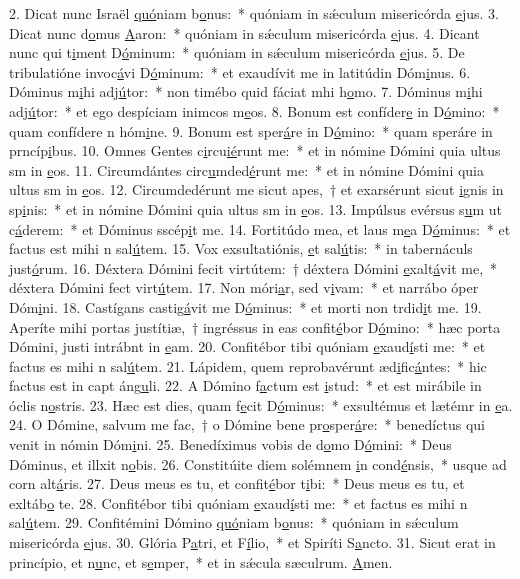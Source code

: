 2. Dicat nunc Israël \uline{quó}niam b\uline{o}nus:~* quóniam in sǽculum misericórda \uline{e}jus.
3. Dicat nunc d\uline{o}mus \uline{A}aron:~* quóniam in sǽculum misericórda \uline{e}jus.
4. Dicant nunc qui t\uline{i}ment D\uline{ó}minum:~* quóniam in sǽculum misericórda \uline{e}jus.
5. De tribulatióne invoc\uline{á}vi D\uline{ó}minum:~* et exaudívit me in latitúdin Dóm\uline{i}nus.
6. Dóminus m\uline{i}hi adj\uline{ú}tor:~* non timébo quid fáciat mhi h\uline{o}mo.
7. Dóminus m\uline{i}hi adj\uline{ú}tor:~* et ego despíciam inimcos m\uline{e}os.
8. Bonum est confíder\uline{e} in D\uline{ó}mino:~* quam confídere n hóm\uline{i}ne.
9. Bonum est sper\uline{á}re in D\uline{ó}mino:~* quam speráre in prncíp\uline{i}bus.
10. Omnes Gentes c\uline{i}rcu\uline{ié}runt me:~* et in nómine Dómini quia ultus sm in \uline{e}os.
11. Circumdántes circ\uline{u}mded\uline{é}runt me:~* et in nómine Dómini quia ultus sm in \uline{e}os.
12. Circumdedérunt me sicut apes,~† et exarsérunt sicut \uline{i}gnis in sp\uline{i}nis:~* et in nómine Dómini quia ultus sm in \uline{e}os.
13. Impúlsus evérsus s\uline{u}m ut c\uline{á}derem:~* et Dóminus sscép\uline{i}t me.
14. Fortitúdo mea, et laus m\uline{e}a D\uline{ó}minus:~* et factus est mihi n sal\uline{ú}tem.
15. Vox exsultatiónis, \uline{e}t sal\uline{ú}tis:~* in tabernáculs just\uline{ó}rum.
16. Déxtera Dómini fecit virtútem:~† déxtera Dómini \uline{e}xalt\uline{á}vit me,~* déxtera Dómini fect virt\uline{ú}tem.
17. Non móri\uline{a}r, sed v\uline{i}vam:~* et narrábo óper Dóm\uline{i}ni.
18. Castígans castig\uline{á}vit me D\uline{ó}minus:~* et morti non trdid\uline{i}t me.
19. Aperíte mihi portas justítiæ,~† ingréssus in eas confit\uline{é}bor D\uline{ó}mino:~* hæc porta Dómini, justi intrábnt in \uline{e}am.
20. Confitébor tibi quóniam \uline{e}xaud\uline{í}sti me:~* et factus es mihi n sal\uline{ú}tem.
21. Lápidem, quem reprobavérunt æd\uline{i}fic\uline{á}ntes:~* hic factus est in capt áng\uline{u}li.
22. A Dómino f\uline{a}ctum est \uline{i}stud:~* et est mirábile in óclis n\uline{o}stris.
23. Hæc est dies, quam f\uline{e}cit D\uline{ó}minus:~* exsultémus et lætémr in \uline{e}a.
24. O Dómine, salvum me fac,~† o Dómine bene pr\uline{o}sper\uline{á}re:~* benedíctus qui venit in nómin Dóm\uline{i}ni.
25. Benedíximus vobis de d\uline{o}mo D\uline{ó}mini:~* Deus Dóminus, et illxit n\uline{o}bis.
26. Constitúite diem solémnem \uline{i}n cond\uline{é}nsis,~* usque ad corn alt\uline{á}ris.
27. Deus meus es tu, et confit\uline{é}bor t\uline{i}bi:~* Deus meus es tu, et exltáb\uline{o} te.
28. Confitébor tibi quóniam \uline{e}xaud\uline{í}sti me:~* et factus es mihi n sal\uline{ú}tem.
29. Confitémini Dómino \uline{quó}niam b\uline{o}nus:~* quóniam in sǽculum misericórda \uline{e}jus.
30. Glória P\uline{a}tri, et F\uline{í}lio,~* et Spiríti S\uline{a}ncto.
31. Sicut erat in princípio, et n\uline{u}nc, et s\uline{e}mper,~* et in sǽcula sæculrum. \uline{A}men.
